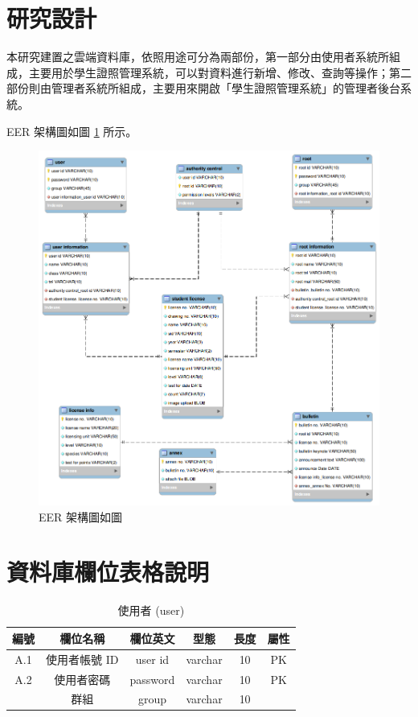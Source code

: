   \section{研究設計}

本研究建置之雲端資料庫，依照用途可分為兩部份，第一部分由使用者系統所組成，主要用於學生證照管理系統，可以對資料進行新增、修改、查詢等操作；第二部份則由管理者系統所組成，主要用來開啟「學生證照管理系統」的管理者後台系統。

EER 架構圖如圖 \ref{fig:eer} 所示。

\begin{figure}[!h]
\centering \includegraphics[width=17cm,keepaspectratio]{ch3/eer.png}
\caption{\label{fig:eer}EER 架構圖如圖}
\end{figure}

  \section{資料庫欄位表格說明}

\begin{table}[H]
\caption{使用者 (user)}
\label{tab:使用者}
\renewcommand{\arraystretch}{1} %
\arrayrulewidth=0.5pt               %
\centering
\begin{tabular}[t]{|c|c|c|c|c|c|}  %
\hline
編號 & 欄位名稱 & 欄位英文 & 型態 & 長度 & 屬性 \\
\hline
A.1 & 使用者帳號 ID & user id & varchar & 10 & PK \\
\hline
A.2 & 使用者密碼 & password & varchar & 10 & PK \\
\hline
& 群組 & group & varchar & 10 &  \\
\hline
\end{tabular}
\end{table}

